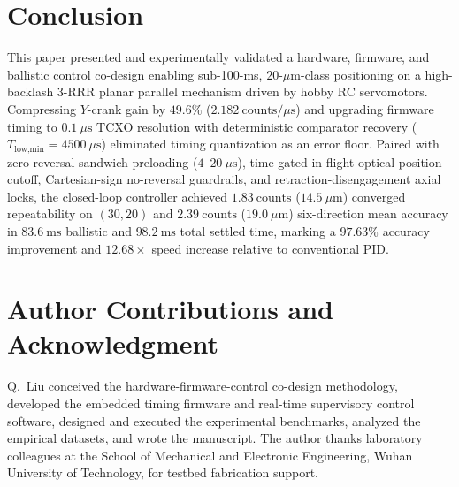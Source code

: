 \documentclass[journal]{IEEEtran}
\begin{document}
\section{Conclusion}

This paper presented and experimentally validated a hardware, firmware, and ballistic control co-design enabling sub-100-ms, $20$-$\mu\text{m}$-class positioning on a high-backlash 3-RRR planar parallel mechanism driven by hobby RC servomotors. Compressing $Y$-crank gain by $49.6\%$ ($2.182\ \text{counts}/\mu\text{s}$) and upgrading firmware timing to $0.1\ \mu\text{s}$ TCXO resolution with deterministic comparator recovery ($T_{\text{low,min}} = 4500\ \mu\text{s}$) eliminated timing quantization as an error floor. Paired with zero-reversal sandwich preloading ($4\text{--}20\ \mu\text{s}$), time-gated in-flight optical position cutoff, Cartesian-sign no-reversal guardrails, and retraction-disengagement axial locks, the closed-loop controller achieved $1.83\ \text{counts}$ ($14.5\ \mu\text{m}$) converged repeatability on $(30, 20)$ and $2.39\ \text{counts}$ ($19.0\ \mu\text{m}$) six-direction mean accuracy in $83.6\ \text{ms}$ ballistic and $98.2\ \text{ms}$ total settled time, marking a $97.63\%$ accuracy improvement and $12.68\times$ speed increase relative to conventional PID.

\section*{Author Contributions and Acknowledgment}

Q.~Liu conceived the hardware-firmware-control co-design methodology, developed the embedded timing firmware and real-time supervisory control software, designed and executed the experimental benchmarks, analyzed the empirical datasets, and wrote the manuscript. The author thanks laboratory colleagues at the School of Mechanical and Electronic Engineering, Wuhan University of Technology, for testbed fabrication support.



\end{document}

